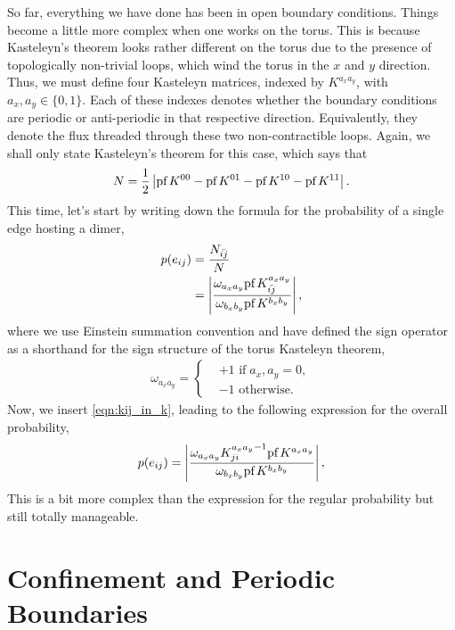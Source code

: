 \documentclass[11pt, oneside]{article} %
\numberwithin{equation}{section}
\begin{document}
So far, everything we have done has been in open boundary conditions. Things become a little more complex when one works on the torus. This is because Kasteleyn's theorem looks rather different on the torus due to the presence of topologically non-trivial loops, which wind the torus in the $x$ and $y$ direction. Thus, we must define four Kasteleyn matrices, indexed by $K^{a_x a_y}$, with $a_x, a_y \in \{0,1\}$. Each of these indexes denotes whether the boundary conditions are periodic or anti-periodic in that respective direction. Equivalently, they denote the flux threaded through these two non-contractible loops. Again, we shall only state Kasteleyn's theorem for this case, which says that
\begin{align} \label{eqn:pbc_n_dimerisations}
    N = \frac 12 \left |  \textup{pf}\, K^{00} -\textup{pf}\, K^{01}-\textup{pf}\, K^{10}-\textup{pf}\, K^{11} \right |.
\end{align}
This time, let's start by writing down the formula for the probability of a single edge hosting a dimer,
\begin{align}
    p(e_{ij}) &= \frac{N_{\bar{ij}}}{N} \\ 
    & = \left |
    \frac
    {\omega_{a_x a_y}\textup{pf}\, K_{\bar{ij}}^{a_x a_y}}
    {\omega_{b_xb_y}\textup{pf}\, K^{b_xb_y}}
    \right |,
\end{align}
where we use Einstein summation convention and have defined the sign operator as a shorthand for the sign structure of the torus Kasteleyn theorem,
\begin{align}
    \omega_{a_x a_y} = \begin{cases}
        & +1 \text{ if}\;a_x,a_y=0, \\
        & -1 \text{ otherwise}.
        \end{cases}
\end{align}
Now, we insert \cref{eqn:kij_in_k}, leading to the following expression for the overall probability,
\begin{align}
    p(e_{ij}) = \left |
    \frac
    {
        \omega_{a_x a_y}
        {K_{ji}^{a_x a_y}}^{-1}
        \textup{pf}\, K^{a_x a_y}  
    }
    {
        \omega_{b_xb_y}\textup{pf}\, K^{b_xb_y}
    }
    \right |,
\end{align}
This is a bit more complex than the expression for the regular probability but still totally manageable.


\section{Confinement and Periodic Boundaries}
\end{document}
